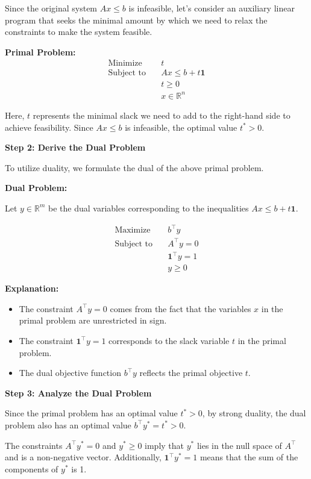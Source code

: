 \documentclass[12pt,letterpaper]{article}
\begin{document}
Since the original system $Ax \leq b$ is infeasible, let's consider an auxiliary linear program that seeks the minimal amount by which we need to relax the constraints to make the system feasible.

\textbf{Primal Problem:}
\begin{align*}
\text{Minimize} \quad & t \\
\text{Subject to} \quad & Ax \leq b + t \mathbf{1} \\
& t \geq 0 \\
& x \in \mathbb{R}^n
\end{align*}

Here, $t$ represents the minimal slack we need to add to the right-hand side to achieve feasibility. Since $Ax \leq b$ is infeasible, the optimal value $t^* > 0$.

\textbf{Step 2: Derive the Dual Problem}

To utilize duality, we formulate the dual of the above primal problem.

\textbf{Dual Problem:}

Let $y \in \mathbb{R}^m$ be the dual variables corresponding to the inequalities $Ax \leq b + t \mathbf{1}$.

\begin{align*}
\text{Maximize} \quad & b^\top y \\
\text{Subject to} \quad & A^\top y = 0 \\
& \mathbf{1}^\top y = 1 \\
& y \geq 0
\end{align*}

\textbf{Explanation:}
\begin{itemize}
\item The constraint $A^\top y = 0$ comes from the fact that the variables $x$ in the primal problem are unrestricted in sign.
\item The constraint $\mathbf{1}^\top y = 1$ corresponds to the slack variable $t$ in the primal problem.
\item The dual objective function $b^\top y$ reflects the primal objective $t$.
\end{itemize}

\textbf{Step 3: Analyze the Dual Problem}

Since the primal problem has an optimal value $t^* > 0$, by strong duality, the dual problem also has an optimal value $b^\top y^* = t^* > 0$.

The constraints $A^\top y^* = 0$ and $y^* \geq 0$ imply that $y^*$ lies in the null space of $A^\top$ and is a non-negative vector. Additionally, $\mathbf{1}^\top y^* = 1$ means that the sum of the components of $y^*$ is 1.
\end{document}
